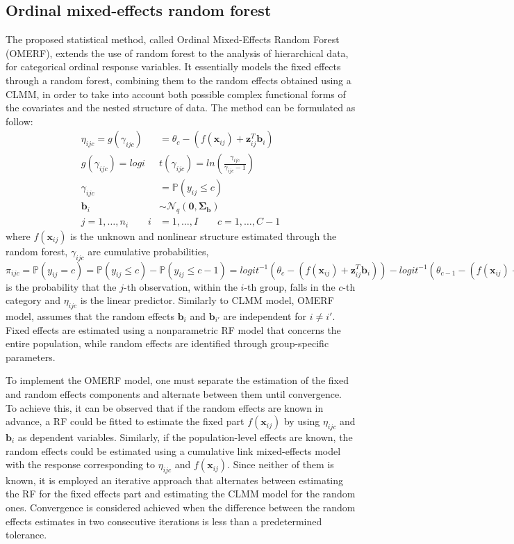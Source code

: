 \subsection{Ordinal mixed-effects random forest}
\label{sec:omerf}
The proposed statistical method, called Ordinal Mixed-Effects Random Forest (OMERF), extends the use of random forest to the analysis of hierarchical data, for categorical ordinal response variables.
It essentially models the fixed effects through a random forest, combining them to the random effects obtained using a CLMM, in order to take into account both possible complex functional forms of the covariates and the nested structure of data.
The method can be formulated as follow:
\begin{equation}
    \label{eq:omerf}
    \begin{aligned}
        \eta_{ijc}  = g(\gamma_{ijc}) &= \theta_{c} - (f(\bm{x}_{ij}) + \bm{z}_{ij}^T \bm{b}_{i})\\
        g(\gamma_{ijc}) = logi&t(\gamma_{ijc}) = ln(\frac{\gamma_{ijc}}{\gamma_{ijc}-1}) \\
        \gamma_{ijc} &= \mathbb{P}(y_{ij} \leq c) \\
        \bm{b}_{i} &\sim \mathcal{N}_q(\bm{0},\bm{\Sigma_{b}}) \\
        j=1,\dots,n_{i} \qquad i&=1,\dots,I \qquad c=1,\dots,C-1
    \end{aligned}
\end{equation}
where \(f(\bm{x}_{ij})\) is the unknown and nonlinear structure estimated through the random forest,
\(\gamma_{ijc}\) are cumulative probabilities, \(\pi_{ijc} = \mathbb{P}(y_{ij}=c) = \mathbb{P}(y_{ij} \leq c) - \mathbb{P}(y_{ij} \leq c-1) = logit^{-1}(\theta_{c} - (f(\bm{x}_{ij}) + \bm{z}_{ij}^T \bm{b}_{i})) - logit^{-1}(\theta_{c-1} - (f(\bm{x}_{ij}) + \bm{z}_{ij}^T \bm{b}_{i}))\) is the probability that the \(j\)-th observation, within the \(i\)-th group, falls in the \(c\)-th category and \(\eta_{ijc}\) is the linear predictor.
Similarly to CLMM model, OMERF model, assumes that the random effects \(\bm{b}_i\) and \(\bm{b}_{i'}\) are independent for \(i \neq i'\).
Fixed effects are estimated using a nonparametric RF model that concerns the entire population, while random effects are identified through group-specific parameters.

To implement the OMERF model, one must separate the estimation of the fixed and random effects components and alternate between them until convergence.
To achieve this, it can be observed that if the random effects are known in advance, a RF could be fitted to estimate the fixed part \(f(\bm{x}_{ij})\) by using \(\eta_{ijc}\) and \(\bm{b}_i\) as dependent variables.
Similarly, if the population-level effects are known, the random effects could be estimated using a cumulative link mixed-effects model with the response corresponding to \(\eta_{ijc}\) and \(f(\bm{x}_{ij})\).
Since neither of them is known, it is employed an iterative approach that alternates between estimating the RF for the fixed effects part and estimating the CLMM model for the random ones.
Convergence is considered achieved when the difference between the random effects estimates in two consecutive iterations is less than a predetermined tolerance.

